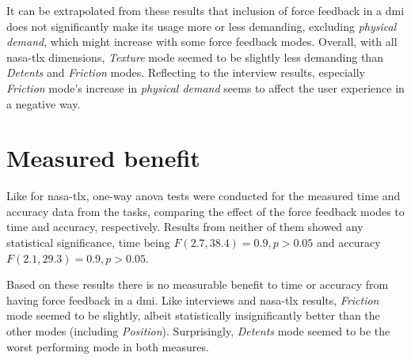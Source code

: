 It can be extrapolated from these results that inclusion of force feedback in a \gls{dmi} does not significantly make its usage more or less demanding, excluding \textit{physical demand}, which might increase with some force feedback modes. Overall, with all \gls{nasa-tlx} dimensions, \textit{Texture} mode seemed to be slightly less demanding than \textit{Detents} and \textit{Friction} modes. Reflecting to the interview results, especially \textit{Friction} mode's increase in \textit{physical demand} seems to affect the user experience in a negative way.

\section{Measured benefit}

Like for \gls{nasa-tlx}, one-way \gls{anova} tests were conducted for the measured time and accuracy data from the tasks, comparing the effect of the force feedback modes to time and accuracy, respectively. Results from neither of them showed any statistical significance, time being $F(2.7, 38.4) = 0.9, p > 0.05$ and accuracy $F(2.1, 29.3) = 0.9, p > 0.05$.

Based on these results there is no measurable benefit to time or accuracy from having force feedback in a \gls{dmi}. Like interviews and \gls{nasa-tlx} results, \textit{Friction} mode seemed to be slightly, albeit statistically insignificantly better than the other modes (including \textit{Position}). Surprisingly, \textit{Detents} mode seemed to be the worst performing mode in both measures.